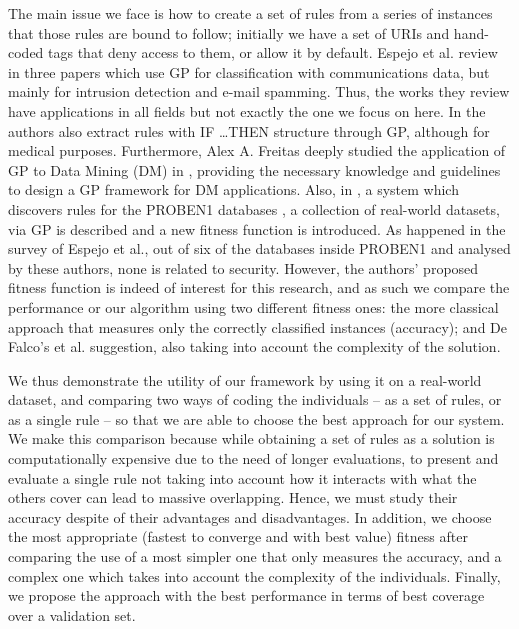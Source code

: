 \documentclass[runningheads]{llncs}
\begin{document}
The main issue we face is how to create a set of rules from a series
of instances that those rules are bound to follow; initially
we have a set of URIs and hand-coded tags that deny access to
them, or allow it by default.  Espejo et al. review in
\cite{espejo2010survey} three papers which use GP for classification
with communications data, but mainly for intrusion detection and
e-mail spamming. Thus, the works they review have applications in all
fields but not exactly the one we focus on here. In
\cite{Tsakonas2004195} the authors also extract rules with \textsc{IF
\ldots THEN} structure through GP, although for medical
purposes. Furthermore, Alex A. Freitas deeply studied the application
of GP to Data Mining (DM) in \cite{freitas2002data}, providing the
necessary knowledge and guidelines to design a GP framework for DM
applications. Also, in \cite{DeFalco2002257}, a system which discovers
rules for the PROBEN1 databases \cite{prechelt1994proben}, a
collection of real-world datasets, via GP is described and a new
fitness function is introduced. As happened in the survey of Espejo et
al., out of six of the databases inside PROBEN1 and analysed by these
authors, none is related to security. However, the authors' proposed
fitness function is indeed of interest for this research, and as such we
compare the performance or our algorithm using two different fitness
ones: the more classical approach that measures only the
correctly classified instances (accuracy); and De Falco's et
al. \cite{DeFalco2002257} suggestion, also taking into account the
complexity of the solution.

We thus demonstrate the utility of our framework by using it on a
real-world dataset, and comparing two 
ways of coding the individuals -- as a set of rules, or as a single
rule -- so that we are able to choose the best approach for our
system. We make this comparison because while obtaining a set of rules
as a solution is computationally expensive due to the need of longer
evaluations, to present and evaluate a single rule not taking into
account how it interacts with what the others cover
\cite{freitas2002data} can lead to massive overlapping. Hence, we must
study their accuracy despite of their advantages and disadvantages. In
addition, we choose the most appropriate (fastest to converge and with
best value) fitness after comparing the use of a most simpler one that
only measures the accuracy, and a complex one which takes into account
the complexity of the individuals. Finally, we propose the approach
with the best performance in terms of best coverage over a validation
set.
\end{document}
